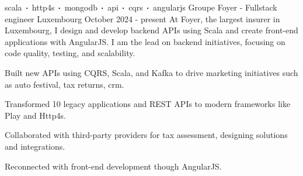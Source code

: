 
\newcommand*{\logo}[2]{\raisebox{-0.2em}{\texttt{[image: \#2]}}\hspace{0.25em}#1}
\newcommand*{\logoonly}[1]{\raisebox{-0.2em}{\texttt{[image: \#1]}}}

\begin{cventries}
    \cventry
    {scala$\sqbig$http4s$\sqbig$mongodb$\sqbig$api$\sqbig$cqrs$\sqbig$angularjs}
    {\logo{Groupe Foyer}{../../../images/foyer.png} - Fullstack engineer}
    {Luxembourg}
    {October 2024 - present}
    {At Foyer, the largest insurer in Luxembourg, I design and develop backend APIs using Scala and create front-end applications with AngularJS. I am the lead on backend initiatives, focusing on code quality, testing, and scalability.}
    {
        \begin{cvitems}
            \item{Built new APIs using CQRS, Scala, and Kafka to drive marketing initiatives such as auto festival, tax returns, crm.}
            \item{Transformed 10 legacy applications and REST APIs to modern frameworks like Play and Http4s.}
            \item{Collaborated with third-party providers for tax assessment, designing solutions and integrations.}
            \item{Reconnected with front-end development though AngularJS.}
        \end{cvitems}
    }




\end{cventries}
